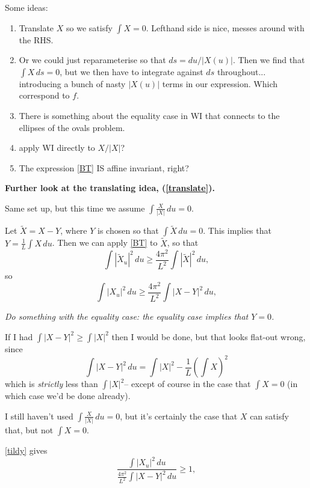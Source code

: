 \documentclass{amsart}
\begin{document}
Some ideas:   
\begin{enumerate}
\item Translate $X$ so we satisfy $\int X=0$.  Lefthand side is nice, messes around with the RHS. \label{translate}

\item Or we could just reparameterise so that $ds=du/|X(u)|$.   Then we find that $\int X \,ds=0$, but we then have to integrate against $ds$ throughout... introducing a bunch of nasty $|X(u)|$ terms in our expression.     Which correspond to $f$.

\item There is something about the equality case in WI that connects to the ellipses of the ovals problem.

\item apply WI directly to $X/|X|$?

\item The expression \eqref{BT} IS affine invariant, right?



\end{enumerate}

\textbf{Further look at the translating idea, (\ref{translate}).}

Same set up, but this time we assume $\int \frac{X}{|X|}\,du=0$. 

Let $\tilde{X}=X-Y$, where $Y$ is chosen so that $\int\tilde{X}\, du=0$.    This implies that $Y=\frac1L\int X \,du$.    Then we can apply \eqref{BT} to $\tilde{X}$, so that 
\[  \int |\tilde{X}_u|^2 \,du \ge \frac{4\pi^2}{L^2}\int |\tilde{X}|^2\,du , \]
so
\begin{equation} \int |{X}_u|^2 \,du \ge \frac{4\pi^2}{L^2}\int |{X}-Y|^2\,du , \label{tildy}\end{equation}

\emph{Do something with the equality case:  the equality case implies that $Y=0$.}

If I had $\int|X-Y|^2\ge\int|X|^2$ then I would be done, but that looks flat-out wrong, since 
\[\int |X-Y|^2 \, du = \int |X|^2- \frac1L\left(\int X\right)^2\]
which is \emph{strictly} less than $\int |X|^2$-- except of course in the case that $\int X=0$ (in which case we'd be done already).   

I still haven't used $\int \frac{X}{|X|}\,du=0$, but it's certainly the case that $X$ can satisfy that, but not $\int X=0$.  

\eqref{tildy} gives 
\begin{equation}\frac{ \int |{X}_u|^2 \,du}{ \frac{4\pi^2}{L^2}\int |{X}-Y|^2\,du }\ge 1, \label{stupid translate} \end{equation}
\end{document}
